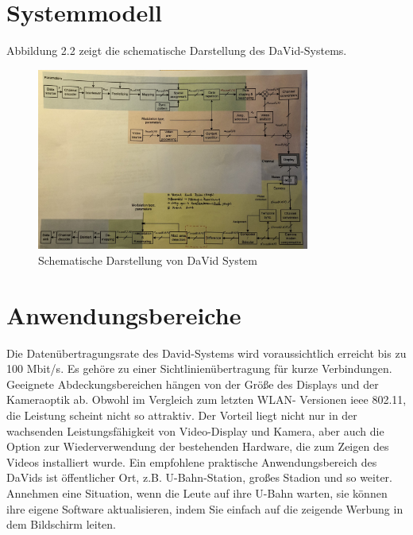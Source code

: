 
\section{Systemmodell} 

Abbildung 2.2 zeigt die schematische Darstellung des DaVid-Systems. 


\begin{figure}[htb]
	\centering 
	\includegraphics[keepaspectratio,width=0.8\textwidth]{images/David3.jpg}
	\caption{Schematische Darstellung von DaVid System}
	\label{fig:David1}
\end{figure}




\section{Anwendungsbereiche} 

Die Datenübertragungsrate des David-Systems wird voraussichtlich erreicht bis zu 100 Mbit/s. Es gehöre	zu einer Sichtlinienübertragung für kurze Verbindungen. Geeignete Abdeckungsbereichen hängen von der Größe des Displays und der Kameraoptik ab. Obwohl im Vergleich zum letzten WLAN- Versionen \gls{ieee} 802.11, die Leistung scheint nicht so attraktiv. Der Vorteil liegt nicht nur in der wachsenden Leistungsfähigkeit von Video-Display und Kamera, aber auch die Option zur Wiederverwendung der bestehenden Hardware, die zum Zeigen des Videos installiert wurde. Ein empfohlene praktische Anwendungsbereich des DaVids ist öffentlicher Ort, z.B. U-Bahn-Station, großes Stadion und so weiter. Annehmen eine Situation, wenn die Leute auf ihre U-Bahn warten, sie können ihre eigene Software aktualisieren, indem Sie einfach auf die zeigende Werbung in dem Bildschirm leiten.

